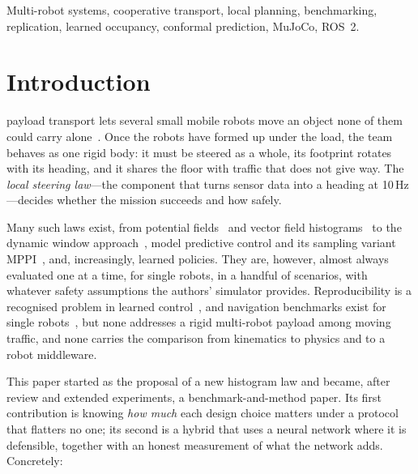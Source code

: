\documentclass[journal]{IEEEtran}
\begin{document}
\begin{IEEEkeywords}
Multi-robot systems, cooperative transport, local planning, benchmarking,
replication, learned occupancy, conformal prediction, MuJoCo, ROS~2.
\end{IEEEkeywords}

\section{Introduction}
 payload transport lets several small mobile
robots move an object none of them could carry
alone~\cite{tuci2018,alonsomora2017,wang2016}. Once the robots have formed up
under the load, the team behaves as one rigid body: it must be steered as a
whole, its footprint rotates with its heading, and it shares the floor with
traffic that does not give way. The \emph{local steering law}---the component
that turns sensor data into a heading at 10\,Hz---decides whether the mission
succeeds and how safely.

Many such laws exist, from potential fields~\cite{khatib1986} and vector field
histograms~\cite{borenstein1991,ulrich1998} to the dynamic window
approach~\cite{fox1997}, model predictive control and its sampling variant
MPPI~\cite{williams2016,williams2018}, and, increasingly, learned policies.
They are, however, almost always evaluated one at a time, for single robots,
in a handful of scenarios, with whatever safety assumptions the authors'
simulator provides. Reproducibility is a recognised problem in learned
control~\cite{henderson2018,bettini2024}, and navigation benchmarks exist for
single robots~\cite{perille2020}, but none addresses a rigid multi-robot
payload among moving traffic, and none carries the comparison from
kinematics to physics and to a robot middleware.

This paper started as the proposal of a new histogram law and became, after
review and extended experiments, a benchmark-and-method paper. Its first
contribution is knowing \emph{how much} each design choice matters under a
protocol that flatters no one; its second is a hybrid that uses a neural
network where it is defensible, together with an honest measurement of what the
network adds. Concretely:
\end{document}
